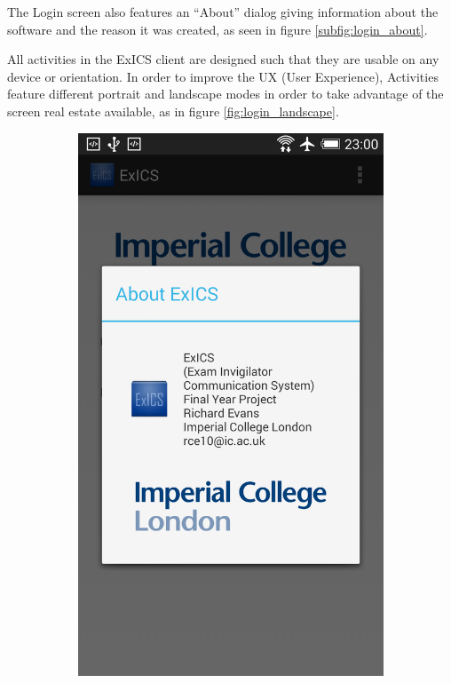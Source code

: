 \FloatBarrier

The Login screen also features an ``About'' dialog giving information about the software and the reason it was created, as seen in figure \ref{subfig:login_about}.

All activities in the ExICS client are designed such that they are usable on any device or orientation.  In order to improve the UX (User Experience), Activities feature different portrait and landscape modes in order to take advantage of the screen real estate available, as in figure \ref{fig:login_landscape}.

\begin{figure}[h]
	\centering
	\begin{subfigure}[b]{0.35\textwidth}
		\includegraphics[width=\textwidth]{"screenshots/about"}

\end{subfigure}
\end{figure}
